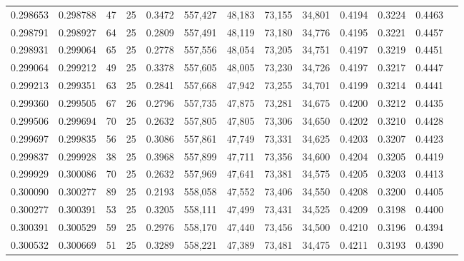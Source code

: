 \begin{tabular}{rrrrrrrrrrrrr}
0.298653 & 0.298788 &    47 &  25 &                                     0.3472 & 557,427 &  48,183 &  73,155 &  34,801 & 0.4194 & 0.3224 & 0.4463 \\
0.298791 & 0.298927 &    64 &  25 &                                     0.2809 & 557,491 &  48,119 &  73,180 &  34,776 & 0.4195 & 0.3221 & 0.4457 \\
0.298931 & 0.299064 &    65 &  25 &                                     0.2778 & 557,556 &  48,054 &  73,205 &  34,751 & 0.4197 & 0.3219 & 0.4451 \\
0.299064 & 0.299212 &    49 &  25 &                                     0.3378 & 557,605 &  48,005 &  73,230 &  34,726 & 0.4197 & 0.3217 & 0.4447 \\
0.299213 & 0.299351 &    63 &  25 &                                     0.2841 & 557,668 &  47,942 &  73,255 &  34,701 & 0.4199 & 0.3214 & 0.4441 \\
0.299360 & 0.299505 &    67 &  26 &                                     0.2796 & 557,735 &  47,875 &  73,281 &  34,675 & 0.4200 & 0.3212 & 0.4435 \\
0.299506 & 0.299694 &    70 &  25 &                                     0.2632 & 557,805 &  47,805 &  73,306 &  34,650 & 0.4202 & 0.3210 & 0.4428 \\
0.299697 & 0.299835 &    56 &  25 &                                     0.3086 & 557,861 &  47,749 &  73,331 &  34,625 & 0.4203 & 0.3207 & 0.4423 \\
0.299837 & 0.299928 &    38 &  25 &                                     0.3968 & 557,899 &  47,711 &  73,356 &  34,600 & 0.4204 & 0.3205 & 0.4419 \\
0.299929 & 0.300086 &    70 &  25 &                                     0.2632 & 557,969 &  47,641 &  73,381 &  34,575 & 0.4205 & 0.3203 & 0.4413 \\
0.300090 & 0.300277 &    89 &  25 &                                     0.2193 & 558,058 &  47,552 &  73,406 &  34,550 & 0.4208 & 0.3200 & 0.4405 \\
0.300277 & 0.300391 &    53 &  25 &                                     0.3205 & 558,111 &  47,499 &  73,431 &  34,525 & 0.4209 & 0.3198 & 0.4400 \\
0.300391 & 0.300529 &    59 &  25 &                                     0.2976 & 558,170 &  47,440 &  73,456 &  34,500 & 0.4210 & 0.3196 & 0.4394 \\
0.300532 & 0.300669 &    51 &  25 &                                     0.3289 & 558,221 &  47,389 &  73,481 &  34,475 & 0.4211 & 0.3193 & 0.4390 \\

\end{tabular}
